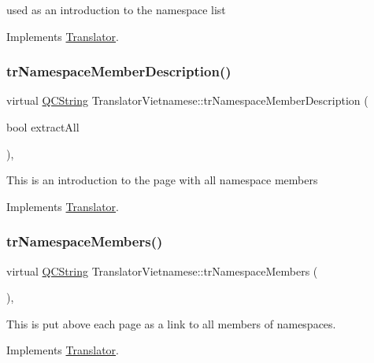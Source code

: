 used as an introduction to the namespace list 

Implements \mbox{\hyperlink{class_translator}{Translator}}.

\mbox{\label{class_translator_vietnamese_a71a47f387300d05b036d5e5cc134d22c}} 
\subsubsection{\texorpdfstring{trNamespaceMemberDescription()}{trNamespaceMemberDescription()}}
{\footnotesize\ttfamily virtual \mbox{\hyperlink{class_q_c_string}{Q\+C\+String}} Translator\+Vietnamese\+::tr\+Namespace\+Member\+Description (\begin{DoxyParamCaption}\item[{bool}]{extract\+All }\end{DoxyParamCaption})\hspace{0.3cm}{\ttfamily [inline]}, {\ttfamily [virtual]}}

This is an introduction to the page with all namespace members 

Implements \mbox{\hyperlink{class_translator}{Translator}}.

\mbox{\label{class_translator_vietnamese_aae4722398dc866d913df382f77de4eb3}} 
\subsubsection{\texorpdfstring{trNamespaceMembers()}{trNamespaceMembers()}}
{\footnotesize\ttfamily virtual \mbox{\hyperlink{class_q_c_string}{Q\+C\+String}} Translator\+Vietnamese\+::tr\+Namespace\+Members (\begin{DoxyParamCaption}{ }\end{DoxyParamCaption})\hspace{0.3cm}{\ttfamily [inline]}, {\ttfamily [virtual]}}

This is put above each page as a link to all members of namespaces. 

Implements \mbox{\hyperlink{class_translator}{Translator}}.

